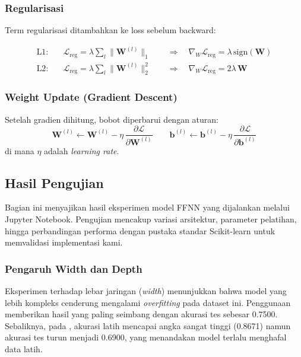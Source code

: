 \subsubsection{Regularisasi}

Term regularisasi ditambahkan ke loss sebelum backward:

\begin{align}
    \text{L1}: \quad &\mathcal{L}_{\text{reg}} = \lambda \sum_l \|\mathbf{W}^{(l)}\|_1
    \qquad \Rightarrow \quad \nabla_W \mathcal{L}_{\text{reg}} = \lambda\,\text{sign}(\mathbf{W}) \\
    \text{L2}: \quad &\mathcal{L}_{\text{reg}} = \lambda \sum_l \|\mathbf{W}^{(l)}\|_2^2
    \qquad \Rightarrow \quad \nabla_W \mathcal{L}_{\text{reg}} = 2\lambda\,\mathbf{W}
\end{align}

\subsubsection{Weight Update (Gradient Descent)}

Setelah gradien dihitung, bobot diperbarui dengan aturan:
\begin{equation}
    \mathbf{W}^{(l)} \leftarrow \mathbf{W}^{(l)} - \eta \, \dfrac{\partial
    \mathcal{L}}{\partial \mathbf{W}^{(l)}}
    \qquad
    \mathbf{b}^{(l)} \leftarrow \mathbf{b}^{(l)} - \eta \, \dfrac{\partial
    \mathcal{L}}{\partial \mathbf{b}^{(l)}}
\end{equation}
di mana $\eta$ adalah \textit{learning rate}.


\subsection{Hasil Pengujian}

Bagian ini menyajikan hasil eksperimen model FFNN yang dijalankan melalui Jupyter Notebook. Pengujian mencakup variasi arsitektur, parameter pelatihan, hingga perbandingan performa dengan pustaka standar Scikit-learn untuk memvalidasi implementasi kami.

\subsubsection{Pengaruh Width dan Depth}

Eksperimen terhadap lebar jaringan (\textit{width}) menunjukkan bahwa model yang lebih kompleks cenderung mengalami \textit{overfitting} pada dataset ini. Penggunaan  memberikan hasil yang paling seimbang dengan akurasi tes sebesar 0.7500. Sebaliknya, pada , akurasi latih mencapai angka sangat tinggi (0.8671) namun akurasi tes turun menjadi 0.6900, yang menandakan model terlalu menghafal data latih.

